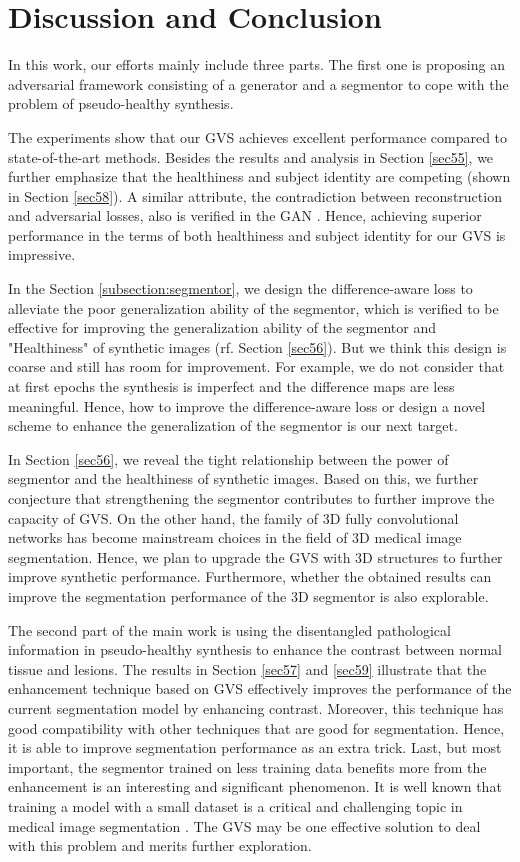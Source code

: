 \documentclass[journal,twoside,web]{ieeecolor}
\begin{document}
\section{Discussion and Conclusion} \label{sec6}
In this work, our efforts mainly include three parts. The first one is proposing an adversarial framework consisting of a generator and a segmentor to cope with the problem of pseudo-healthy synthesis.  

The experiments show that our GVS achieves excellent performance compared to state-of-the-art methods. Besides the results and analysis in Section \ref{sec55}, we further emphasize that the healthiness and subject identity are competing (shown in Section \ref{sec58}). A similar attribute, the contradiction between reconstruction and adversarial losses, also is verified in the GAN \cite{ramasinghe2020conditional}. Hence, achieving superior performance in the terms of both healthiness and subject identity for our GVS is impressive.

In the Section \ref{subsection:segmentor}, we design the difference-aware loss to alleviate the poor generalization ability of the segmentor, which is verified to be effective for improving the generalization ability of the segmentor and "Healthiness" of synthetic images (rf. Section \ref{sec56}). But we think this design is coarse and still has room for improvement. For example, we do not consider that at first epochs the synthesis is imperfect and the difference maps are less meaningful.   Hence, how to improve the difference-aware loss or design a novel scheme to enhance the generalization of the segmentor is our next target.

In Section \ref{sec56}, we reveal the tight relationship between the power of segmentor and the healthiness of synthetic images. Based on this, we further conjecture that strengthening the segmentor contributes to further improve the capacity of GVS. On the other hand, the family of 3D fully convolutional networks has become mainstream choices in the field of 3D medical image segmentation. Hence, we plan to upgrade the GVS with 3D structures to further improve synthetic performance. Furthermore, whether the obtained results can improve the segmentation performance of the 3D segmentor is also explorable.

The second part of the main work is using the disentangled pathological information in pseudo-healthy synthesis to enhance the contrast between normal tissue and lesions. The results in Section \ref{sec57} and \ref{sec59} illustrate that the enhancement technique based on GVS effectively improves the performance of the current segmentation model by enhancing contrast. Moreover, this technique has good compatibility with other techniques that are good for segmentation. Hence, it is able to improve segmentation performance as an extra trick. Last, but most important, the segmentor trained on less training data benefits more from the enhancement is an interesting and significant phenomenon. It is well known that training a model with a small dataset is a critical and challenging topic in medical image segmentation \cite{zhang2019survey}. The GVS may be one effective solution to deal with this problem and merits further exploration.
\end{document}
